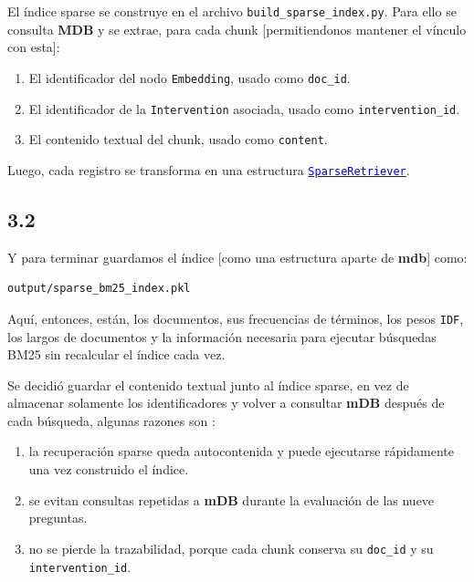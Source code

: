 \documentclass{article}
\begin{document}
El índice sparse se construye en el archivo \texttt{build\_sparse\_index.py}. Para ello se consulta \textbf{MDB} y se extrae, para cada chunk [permitiendonos mantener el vínculo con esta]:

\begin{enumerate}
    \item El identificador del nodo \texttt{Embedding}, usado como \texttt{doc\_id}.
    \item El identificador de la \texttt{Intervention} asociada, usado como \texttt{intervention\_id}.
    \item El contenido textual del chunk, usado como \texttt{content}.
\end{enumerate}

Luego, cada registro se transforma en una estructura
\href{https://github.com/canija2000/pdm_tarea2/blob/0532dcff704bc5bcff71e821918d4ba6a240acdf/sparse_retriever.py#L20}{\textcolor{blue}{\texttt{SparseRetriever}}}.

\subsection*{3.2}

Y para terminar guardamos el índice [como una estructura aparte de \textbf{mdb}] como:

\begin{lstlisting}[language=Bash]
output/sparse_bm25_index.pkl
\end{lstlisting}

Aquí, entonces, están, los documentos, sus frecuencias de términos, los pesos \texttt{IDF}, los largos de documentos y la información necesaria para ejecutar búsquedas BM25 sin recalcular el índice cada vez.

Se decidió guardar el contenido textual junto al índice sparse, en vez de almacenar solamente los identificadores y volver a consultar \textbf{mDB} después de cada búsqueda, algunas razones son :

\begin{enumerate}
    \item la recuperación sparse queda autocontenida y puede ejecutarse rápidamente una vez construido el índice.
    \item se evitan consultas repetidas a \textbf{mDB}  durante la evaluación de las nueve preguntas.
    \item no se pierde la trazabilidad, porque cada chunk conserva su \texttt{doc\_id} y su \texttt{intervention\_id}.
\end{enumerate}
\end{document}
